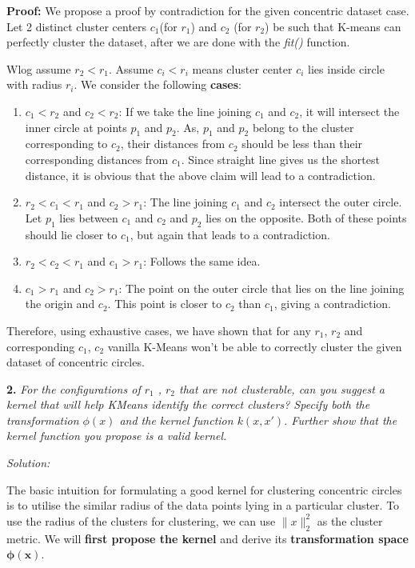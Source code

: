 \documentclass[11pt]{article}
\begin{document}
\textbf{Proof: } We propose a proof by contradiction for the given concentric dataset case. Let 2 distinct cluster centers $c_1$(for $r_1$) and $c_2$ (for $r_2$) be such that K-means can perfectly cluster the dataset, after we are done with the \textit{fit()} function.
 
Wlog assume $r_2 < r_1$. Assume $c_i < r_i$ means cluster center $c_i$ lies inside circle with radius $r_i$. We consider the following \textbf{cases}:%
\begin{enumerate}
    \item $c_1 < r_2$ and $c_2 < r_2$: If we take the line joining $c_1$ and $c_2$, it will intersect the inner circle at points $p_1$ and $p_2$. As, $p_1$ and $p_2$ belong to the cluster corresponding to $c_2$, their distances from $c_2$ should be less than their corresponding distances from $c_1$. Since straight line gives us the shortest distance, it is obvious that the above claim will lead to a contradiction.
    
    \item $r_2 < c_1 < r_1$ and $c_2 > r_1$: The line joining $c_1$ and $c_2$ intersect the outer circle. Let $p_1$ lies between $c_1$ and $c_2$ and $p_2$ lies on the opposite. Both of these points should lie closer to $c_1$, but again that leads to a contradiction. 
    
    \item $r_2 < c_2 < r_1$ and $c_1 > r_1$: Follows the same idea.
    
    \item $c_1 > r_1$ and $c_2 > r_1$: The point on the outer circle that lies on the line joining the origin and $c_2$. This point is closer to $c_2$ than $c_1$, giving a contradiction.
\end{enumerate}

Therefore, using exhaustive cases, we have shown that for any $r_1$, $r_2$ and corresponding $c_1$, $c_2$ vanilla K-Means won't be able to correctly cluster the given dataset of concentric circles.




\textbf{2. } \textit{For the configurations of $r_1$ , $r_2$ that are not clusterable, can you suggest a kernel that will help KMeans identify the correct clusters? Specify both the transformation $\phi(x)$ and the kernel function $k(x, x')$. Further show that the kernel function you propose is a valid kernel.}

\textit{Solution: } 

The basic intuition for formulating a good kernel for clustering concentric circles is to utilise the similar radius of the data points lying in a particular cluster. To use the radius of the clusters for clustering, we can use $\lVert x \rVert_{2}^{2}$ as the cluster metric. We will \textbf{first propose the kernel} and derive its \textbf{transformation space} $\boldsymbol{\phi(x)}$.
\end{document}
